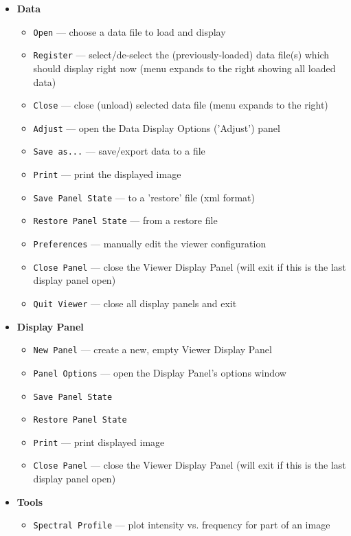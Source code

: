 \begin{itemize}
\item {\bf Data}
  \begin{itemize}
      \item  {\tt Open} --- choose a data file to load and display
      \item  {\tt Register} --- select/de-select the (previously-loaded)
             data file(s) which should display right now (menu expands
	     to the right showing all loaded data) 
      \item  {\tt Close} --- close (unload) selected data file (menu
             expands to the right)
      \item  {\tt Adjust} --- open the Data Display Options ('Adjust') panel 
      \item  {\tt Save as...} --- save/export data to a file
      \item  {\tt Print} --- print the displayed image
      \item  {\tt Save Panel State} --- to a 'restore' file (xml format)
      \item  {\tt Restore Panel State} --- from a restore file
      \item  {\tt Preferences} --- manually edit the viewer configuration
      \item  {\tt Close Panel} --- close the Viewer Display Panel (will exit
             if this is the last display panel open)
      \item  {\tt Quit Viewer} --- close all display panels and exit
  \end{itemize}
\item {\bf Display Panel}
  \begin{itemize}
      \item {\tt New Panel} --- create a new, empty Viewer Display Panel
      \item {\tt Panel Options} --- open the Display Panel's options window
      \item  {\tt Save Panel State}
      \item  {\tt Restore Panel State}
      \item {\tt Print} --- print displayed image
      \item {\tt Close Panel} --- close the Viewer Display Panel (will exit if
            this is the last display panel open)
  \end{itemize}
\item {\bf Tools}
  \begin{itemize}
      \item {\tt Spectral Profile} --- plot intensity vs. frequency for part of an image

\end{itemize}
\end{itemize}
